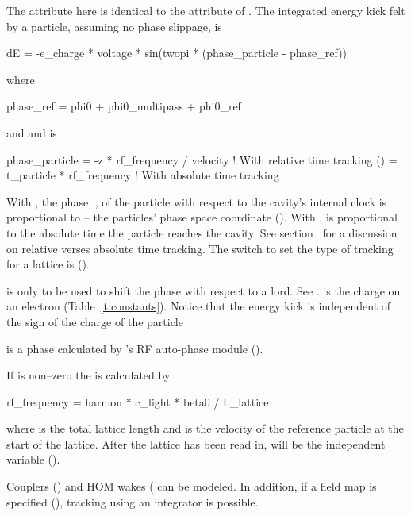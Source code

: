 {The  attribute here is identical to the  attribute of
\mad. The integrated energy kick felt by a particle, assuming no phase slippage, is 
\begin{example}
  dE = -e_charge * voltage * sin(twopi * (phase_particle - phase_ref))
\end{example}
where
\begin{example}
  phase_ref = phi0 + phi0_multipass + phi0_ref
\end{example}
and
and  is
\begin{example}
  phase_particle = -z * rf_frequency / velocity  ! With relative time tracking ()
                 =  t_particle * rf_frequency    ! With absolute time tracking
\end{example}
With , the phase, , of the
particle with respect to the cavity's internal clock is proportional
to  -- the particles' phase space coordinate
(). With ,
 is proportional to the absolute time the particle
reaches the cavity. See section~ for a discussion on
relative verses absolute time tracking. The switch to set the type of
tracking for a lattice is 
().

 is only to be used to shift the phase with respect to a
 lord. See .  is the
charge on an electron (Table~\ref{t:constants}). Notice that the
energy kick is independent of the sign of the charge of the particle

 is a phase calculated by \bmad's RF auto-phase module
().

If  is non--zero the  is calculated by
\begin{example}
  rf_frequency = harmon * c_light * beta0 / L_lattice 
\end{example}
where  is the total lattice length and  is the
velocity of the reference particle at the start of the lattice. After
the lattice has been read in,  will be the
independent variable ().

Couplers () and HOM wakes ( can
be modeled. In addition, if a field map is specified
(), tracking using an integrator is possible.

}
